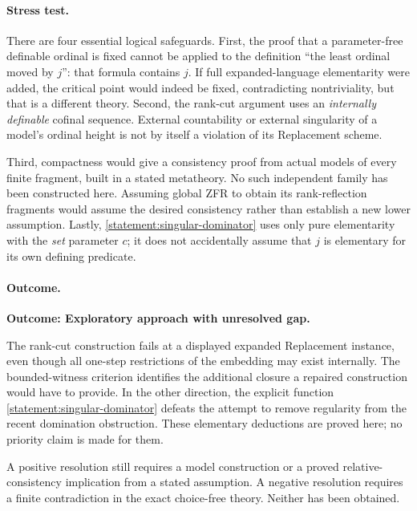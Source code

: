 \documentclass[11pt]{article}
\begin{document}
\paragraph{Stress test.}
There are four essential logical safeguards.  First, the proof that a
parameter-free definable ordinal is fixed cannot be applied to the definition
``the least ordinal moved by $j$'': that formula contains $j$.  If full
expanded-language elementarity were added, the critical point would indeed
be fixed, contradicting nontriviality, but that is a different theory.
Second, the rank-cut argument uses an \emph{internally definable} cofinal
sequence.  External countability or external singularity of a model's ordinal
height is not by itself a violation of its Replacement scheme.

Third, compactness would give a consistency proof from actual models of every
finite fragment, built in a stated metatheory.  No such independent family
has been constructed here.  Assuming global ZFR to obtain its rank-reflection
fragments would assume the desired consistency rather than establish a new
lower assumption.  Lastly, \eqref{statement:singular-dominator} uses only pure
elementarity with the \emph{set} parameter $c$; it does not accidentally assume
that $j$ is elementary for its own defining predicate.  

\paragraph{Outcome.}
\textbf{Outcome: Exploratory approach with unresolved gap.}

The rank-cut construction fails at a displayed expanded Replacement instance,
even though all one-step restrictions of the embedding may exist internally.
The bounded-witness criterion identifies the additional closure a repaired
construction would have to provide.  In the other direction, the explicit
function \eqref{statement:singular-dominator} defeats the attempt to remove
regularity from the recent domination obstruction.  These elementary
deductions are proved here; no priority claim is made for them.

A positive resolution still requires a model construction or a proved
relative-consistency implication from a stated assumption.  A negative
resolution requires a finite contradiction in the exact choice-free theory.
Neither has been obtained.
\end{document}

